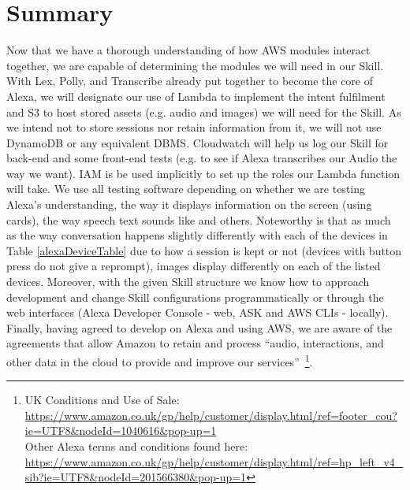 \section{Summary}
Now that we have a thorough understanding of how AWS modules interact together, we are capable of determining the modules we will need in our Skill. With Lex, Polly, and Transcribe already put together to become the core of Alexa, we will designate our use of Lambda to implement the intent fulfilment and S3 to host stored assets (e.g. audio and images) we will need for the Skill. As we intend not to store sessions nor retain information from it, we will not use DynamoDB or any equivalent DBMS. Cloudwatch will help us log our Skill for back-end and some front-end tests (e.g. to see if Alexa transcribes our Audio the way we want). IAM is be used implicitly to set up the roles our Lambda function will take.  We use all testing software depending on whether we are testing Alexa's understanding, the way it displays information on the screen (using cards), the way speech text sounds like and others. Noteworthy is that as much as the way conversation happens slightly differently with each of the devices in Table \ref{alexaDeviceTable} due to how a session is kept or not (devices with button press do not give a reprompt), images display differently on each of the listed devices. %
Moreover, with the given Skill structure we know how to approach development and change Skill configurations %
programmatically
or through the web interfaces (Alexa Developer Console - web, ASK and AWS CLIs - locally). 
Finally, having agreed to develop on Alexa and using AWS, we are aware of the agreements that allow Amazon to retain and process ``audio, interactions, and other data in the cloud to provide and improve our services''~\footnote{UK Conditions and Use of Sale: \url{https://www.amazon.co.uk/gp/help/customer/display.html/ref=footer_cou?ie=UTF8&nodeId=1040616&pop-up=1}\\
Other Alexa terms and conditions found here: \url{https://www.amazon.co.uk/gp/help/customer/display.html/ref=hp_left_v4_sib?ie=UTF8&nodeId=201566380&pop-up=1}
}.


